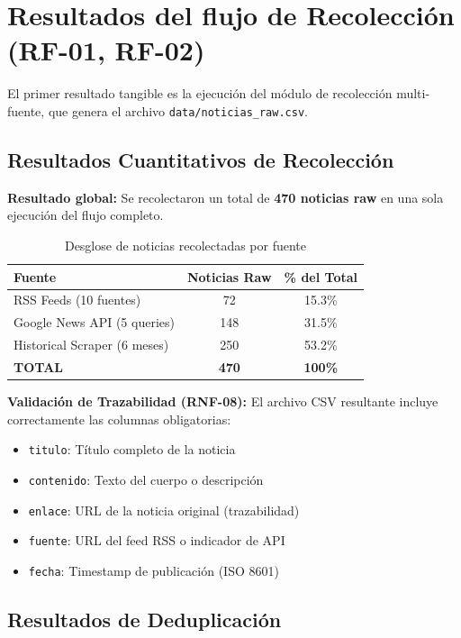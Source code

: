 \section{Resultados del flujo de Recolección (RF-01, RF-02)}
\label{sec:resultados_recoleccion}

El primer resultado tangible es la ejecución del módulo de recolección multi-fuente, que genera el archivo \texttt{data/noticias\_raw.csv}.

\subsection{Resultados Cuantitativos de Recolección}
\label{subsec:resultados_cuantitativos}

\textbf{Resultado global:} Se recolectaron un total de \textbf{470 noticias raw} en una sola ejecución del flujo completo.

\begin{table}[h]
\centering
\caption{Desglose de noticias recolectadas por fuente}
\begin{tabular}{|l|c|c|}
\hline
\textbf{Fuente} & \textbf{Noticias Raw} & \textbf{\% del Total} \\ \hline
RSS Feeds (10 fuentes) & 72 & 15.3\% \\ \hline
Google News API (5 queries) & 148 & 31.5\% \\ \hline
Historical Scraper (6 meses) & 250 & 53.2\% \\ \hline
\textbf{TOTAL} & \textbf{470} & \textbf{100\%} \\ \hline
\end{tabular}
\end{table}

\textbf{Validación de Trazabilidad (RNF-08):} El archivo CSV resultante incluye correctamente las columnas obligatorias:
\begin{itemize}
    \item \texttt{titulo}: Título completo de la noticia
    \item \texttt{contenido}: Texto del cuerpo o descripción
    \item \texttt{enlace}: URL de la noticia original (trazabilidad)
    \item \texttt{fuente}: URL del feed RSS o indicador de API
    \item \texttt{fecha}: Timestamp de publicación (ISO 8601)
\end{itemize}

\subsection{Resultados de Deduplicación}
\label{subsec:resultados_dedup}

